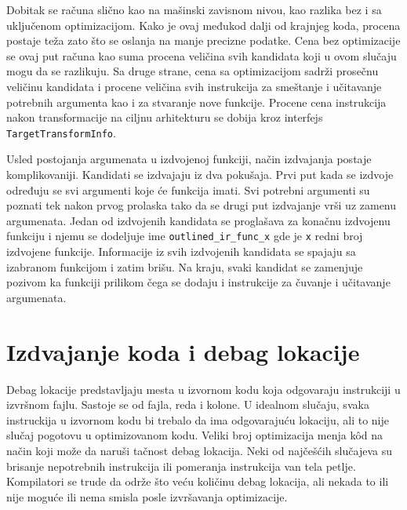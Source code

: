 \documentclass[12pt,oneside]{memoir}
\begin{document}
Dobitak se računa slično kao na mašinski zavisnom nivou, kao razlika bez i sa uključenom optimizacijom.
Kako je ovaj međukod dalji od krajnjeg koda, procena postaje teža zato što se oslanja na manje precizne podatke.
Cena bez optimizacije se ovaj put računa kao suma procena veličina svih kandidata koji u ovom slučaju mogu da se razlikuju.
Sa druge strane, cena sa optimizacijom sadrži prosečnu veličinu kandidata i procene veličina svih instrukcija za smeštanje i učitavanje potrebnih argumenta kao i za stvaranje nove funkcije.
Procene cena instrukcija nakon transformacije na ciljnu arhitekturu se dobija kroz interfejs \verb|TargetTransformInfo|.

Usled postojanja argumenata u izdvojenoj funkciji, način izdvajanja postaje komplikovaniji.
Kandidati se izdvajaju iz dva pokušaja. Prvi put kada se izdvoje određuju se svi argumenti koje će funkcija imati.
Svi potrebni argumenti su poznati tek nakon prvog prolaska tako da se drugi put izdvajanje vrši uz zamenu argumenata.
Jedan od izdvojenih kandidata se proglašava za konačnu izdvojenu funkciju i
njemu se dodeljuje ime \verb|outlined_ir_func_x| gde je \verb|x| redni broj izdvojene funkcije.
Informacije iz svih izdvojenih kandidata se spajaju sa izabranom funkcijom i zatim brišu.
Na kraju, svaki kandidat se zamenjuje pozivom ka funkciji prilikom čega se dodaju i instrukcije za čuvanje i učitavanje argumenata.

\section{Izdvajanje koda i debag lokacije}

\label{sec:izdvajanje_koda_debag}

Debag lokacije predstavljaju mesta u izvornom kodu koja odgovaraju instrukciji u izvršnom fajlu. Sastoje se od fajla, reda i kolone.
U idealnom slučaju, svaka instruckija u izvornom kodu bi trebalo da ima odgovarajuću lokaciju, ali to nije slučaj pogotovu u optimizovanom kodu.
Veliki broj optimizacija menja k\^od na način koji može da naruši tačnost debag lokacija.
Neki od najčešćih slučajeva su brisanje nepotrebnih instrukcija ili pomeranja instrukcija van tela petlje.
Kompilatori se trude da održe što veću količinu debag lokacija, ali nekada to ili nije moguće ili nema smisla posle izvršavanja optimizacije.
\end{document}
